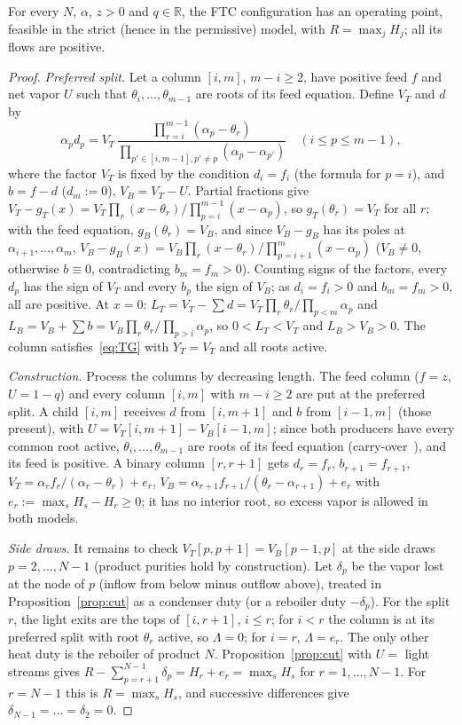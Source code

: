 \documentclass[11pt,a4paper]{report}
\newcommand{\Lam}{\Lambda}
\begin{document}
\begin{theorem}\label{thm:achieve}
For every $N$, $\alpha$, $z>0$ and $q\in\mathbb R$, the FTC configuration has an operating point, feasible in the strict
(hence in the permissive) model, with $R=\max_jH_j$; all its flows are positive.
\end{theorem}
\begin{proof}
\emph{Preferred split.} Let a column $[i,m]$, $m-i\ge2$, have positive feed $f$ and net vapor $U$ such that
$\theta_i,\dots,\theta_{m-1}$ are roots of its feed equation. Define $V_T$ and $d$ by
\[\alpha_pd_p=V_T\,\frac{\prod_{r=i}^{m-1}(\alpha_p-\theta_r)}{\prod_{p'\in[i,m-1],p'\ne p}(\alpha_p-\alpha_{p'})}\quad(i\le p\le m-1),\]
where the factor $V_T$ is fixed by the condition $d_i=f_i$ (the formula for $p=i$), and $b=f-d$ ($d_m:=0$), $V_B=V_T-U$. Partial fractions give $V_T-g_T(x)=V_T\prod_r(x-\theta_r)/\prod_{p=i}^{m-1}(x-\alpha_p)$, so
$g_T(\theta_r)=V_T$ for all $r$; with the feed equation, $g_B(\theta_r)=V_B$, and since $V_B-g_B$ has its poles at
$\alpha_{i+1},\dots,\alpha_m$, $V_B-g_B(x)=V_B\prod_r(x-\theta_r)/\prod_{p=i+1}^{m}(x-\alpha_p)$ ($V_B\ne0$, otherwise $b\equiv0$,
contradicting $b_m=f_m>0$). Counting signs of the factors, every $d_p$ has the sign of $V_T$ and every $b_p$ the sign of
$V_B$; as $d_i=f_i>0$ and $b_m=f_m>0$, all are positive. At $x=0$: $L_T=V_T-\sum d=V_T\prod_r\theta_r/\prod_{p<m}\alpha_p$ and
$L_B=V_B+\sum b=V_B\prod_r\theta_r/\prod_{p>i}\alpha_p$, so $0<L_T<V_T$ and $L_B>V_B>0$. The column satisfies~\eqref{eq:TG}
with $Y_T=V_T$ and all roots active.

\emph{Construction.} Process the columns by decreasing length. The feed column ($f=z$, $U=1-q$) and every column
$[i,m]$ with $m-i\ge2$ are put at the preferred split. A child $[i,m]$ receives $d$ from $[i,m+1]$ and $b$ from
$[i-1,m]$ (those present), with $U=V_T[i,m+1]-V_B[i-1,m]$; since both producers have every common root active,
$\theta_i,\dots,\theta_{m-1}$ are roots of its feed equation (carry-over~\autocite{CW89,HS2}), and its feed is positive.
A binary column $[r,r+1]$ gets $d_r=f_r$, $b_{r+1}=f_{r+1}$, $V_T=\alpha_rf_r/(\alpha_r-\theta_r)+e_r$,
$V_B=\alpha_{r+1}f_{r+1}/(\theta_r-\alpha_{r+1})+e_r$ with $e_r:=\max_sH_s-H_r\ge0$; it has no interior root, so excess
vapor is allowed in both models.

\emph{Side draws.} It remains to check $V_T[p,p+1]=V_B[p-1,p]$ at the side draws $p=2,\dots,N-1$ (product purities hold
by construction). Let $\delta_p$ be the vapor lost at the node of $p$ (inflow from below minus outflow above), treated in
Proposition~\ref{prop:cut} as a condenser duty (or a reboiler duty $-\delta_p$). For the split $r$, the light exits are
the tops of $[i,r+1]$, $i\le r$; for $i<r$ the column is at its preferred split with root $\theta_r$ active, so
$\Lam=0$; for $i=r$, $\Lam=e_r$. The only other heat duty is the reboiler of product $N$. Proposition~\ref{prop:cut}
with $U=$ light streams gives $R-\sum_{p=r+1}^{N-1}\delta_p=H_r+e_r=\max_sH_s$ for $r=1,\dots,N-1$. For $r=N-1$ this is
$R=\max_sH_s$, and successive differences give $\delta_{N-1}=\dots=\delta_2=0$.
\end{proof}
\end{document}
